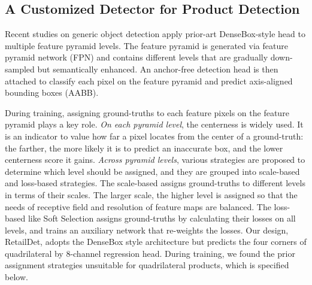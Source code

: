 \documentclass[runningheads]{llncs}
\begin{document}
\subsection{A Customized Detector for Product Detection}
Recent studies \cite{zhang2020bridging,tian2019fcos,zhu2020soft,foveabox,Chen2020NCMS} on generic object detection apply prior-art DenseBox-style head \cite{densebox} to multiple feature pyramid levels. The feature pyramid is generated via feature pyramid network (FPN) \cite{lin2016feature} and contains different levels that are gradually down-sampled but semantically enhanced. An anchor-free detection head is then attached to classify each pixel on the feature pyramid and predict axis-aligned bounding boxes (AABB). 

During training, assigning ground-truths to each feature pixels on the feature pyramid plays a key role. \textit{On each pyramid level}, the centerness \cite{tian2019fcos} is widely used. It is an indicator to value how far a pixel locates from the center of a ground-truth: the farther, the more likely it is to predict an inaccurate box, and the lower centerness score it gains. \textit{Across pyramid levels}, various strategies are proposed to determine which level should be assigned, and they are grouped into scale-based and loss-based strategies. The scale-based \cite{lin2016feature,foveabox,ren2015faster,tian2019fcos} assigns ground-truths to different levels in terms of their scales. The larger scale, the higher level is assigned so that the needs of receptive field and resolution of feature maps are balanced. The loss-based like Soft Selection \cite{zhu2020soft} assigns ground-truths by calculating their losses on all levels, and trains an auxiliary network that re-weights the losses. Our design, RetailDet, adopts the DenseBox style architecture but predicts the four corners of quadrilateral by 8-channel regression head. During training, we found the prior assignment strategies unsuitable for quadrilateral products, which is specified below.    

 
\end{document}
